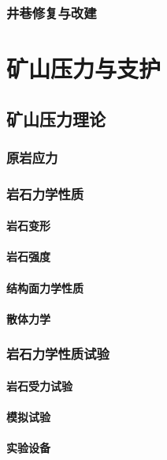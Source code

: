 \documentclass[UTF8]{../../ApplicationUniverse}
\begin{document}
    \subsection{井巷修复与改建}









\chapter{矿山压力与支护}
\section{矿山压力理论}
    \subsection{原岩应力}
    \subsection{岩石力学性质}
        \subsubsection{岩石变形}
        \subsubsection{岩石强度}
        \subsubsection{结构面力学性质}
        \subsubsection{散体力学}
    \subsection{岩石力学性质试验}
        \subsubsection{岩石受力试验}
        \subsubsection{模拟试验}
        \subsubsection{实验设备}
\end{document}
